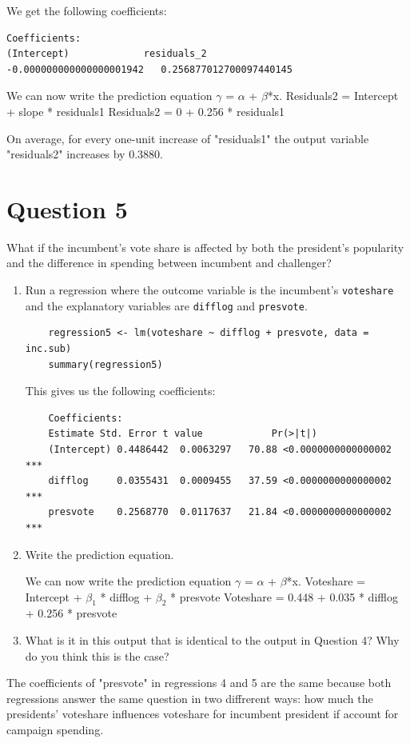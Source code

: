 \documentclass[12pt,letterpaper]{article}
\begin{document}
\begin{enumerate}
We get the following coefficients: 

\begin{BVerbatim}
Coefficients:
(Intercept)         	residuals_2  
-0.000000000000000001942   0.256877012700097440145  
\end{BVerbatim}

We can now write the prediction equation $\gamma$ = $\alpha$ + $\beta$*x.
\newline Residuals2 = Intercept + slope * residuals1
\newline Residuals2	 = 0 + 0.256 * residuals1


On average, for every one-unit increase of "residuals1" the output variable "residuals2" increases by 0.3880. 


		
	\end{enumerate}
	
	\newpage	

\section*{Question 5}
\noindent What if the incumbent's vote share is affected by both the president's popularity and the difference in spending between incumbent and challenger? 
	\begin{enumerate}
		\item Run a regression where the outcome variable is the incumbent's \texttt{voteshare} and the explanatory variables are \texttt{difflog} and \texttt{presvote}.
		
\begin{BVerbatim}
	regression5 <- lm(voteshare ~ difflog + presvote, data = inc.sub)
	summary(regression5)
\end{BVerbatim}

This gives us the following coefficients: 

\begin{BVerbatim}
	Coefficients:
	Estimate Std. Error t value            Pr(>|t|)    
	(Intercept) 0.4486442  0.0063297   70.88 <0.0000000000000002 ***
	difflog     0.0355431  0.0009455   37.59 <0.0000000000000002 ***
	presvote    0.2568770  0.0117637   21.84 <0.0000000000000002 ***
\end{BVerbatim}


		\item Write the prediction equation.	\vspace{.5 cm}
		
We can now write the prediction equation $\gamma$ = $\alpha$ + $\beta$*x.
\newline Voteshare = Intercept + $\beta_1$ * difflog + $\beta_2$ * presvote
\newline Voteshare	 = 0.448 + 0.035 * difflog + 0.256 * presvote



		\item What is it in this output that is identical to the output in Question 4? Why do you think this is the case?
	\end{enumerate}

The coefficients of "presvote" in regressions 4 and 5 are the same because both regressions answer the same question in two diffrerent ways: how much the presidents' voteshare influences voteshare for incumbent president if account for campaign spending.
\end{document}
